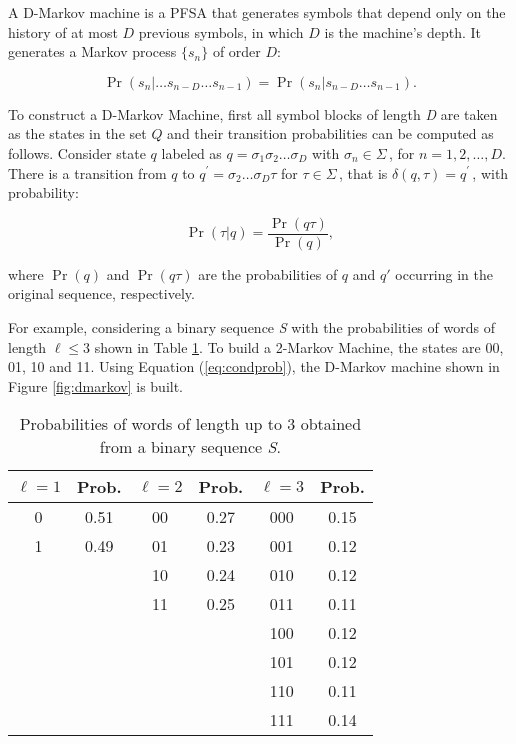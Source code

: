 {A D-Markov machine is a PFSA that generates symbols that depend only on the history of at most $D$ previous symbols, in which $D$ is the machine's depth. It generates a Markov process $\{s_n\}$ of order $D$:

\[
\Pr(s_n|\ldots s_{n-D}\ldots s_{n-1}) = \Pr(s_n|s_{n-D}\ldots s_{n-1}).
\]

\noindent To construct a D-Markov Machine, first all symbol blocks of length \textit{D} are taken as the states in the set $Q$ and their transition probabilities can be computed as follows. Consider state $q$ labeled as $q = \sigma_1\sigma_2\ldots\sigma_{D}$ with $\sigma_n\in\Sigma\,$, for $n = 1,2,\ldots,D$. There is a transition from $q$ to $q^{\prime} = \sigma_2\ldots\sigma_{D}\tau$ for $\tau\in\Sigma$\,, that is $\delta(q,\tau) = q^{\prime}\,$, with probability:

\begin{equation}\label{eq:condprob}
\Pr(\tau | q) = \frac{\Pr(q\tau)}{\Pr(q)},
\end{equation}

\noindent where $\Pr(q)$ and $\Pr(q\tau)$ are the probabilities of $q$ and $q'$ occurring in the original sequence, respectively.

For example, considering a binary sequence \textit{S} with the probabilities of words of length $\ell \leq 3$ shown in Table \ref{tab:subseq}. To build a 2-Markov Machine, the states are 00, 01, 10 and 11.  Using Equation (\ref{eq:condprob}), the D-Markov machine shown in Figure \ref{fig:dmarkov} is built.

\begin{table}
\centering
\caption{Probabilities of words of length up to 3 obtained from a binary sequence \textit{S}. \label{tab:subseq}}
\begin{tabular}{|c|c|c|c|c|c|}
\hline
$\ell = 1$ & Prob. & $\ell = 2$ & Prob. & $\ell = 3$ & Prob. \\
\hline
0 & 0.51 & 00 & 0.27 & 000 & 0.15\\
1 & 0.49 & 01 & 0.23 & 001 & 0.12\\
  &      & 10 & 0.24 & 010 & 0.12\\
  &      & 11 & 0.25 & 011 & 0.11\\
  &	     &    &      & 100 & 0.12\\
  &      &    &      & 101 & 0.12\\
  &      &    &      & 110 & 0.11\\
  &      &    &      & 111 & 0.14\\
\hline
\end{tabular}
\end{table}

}
